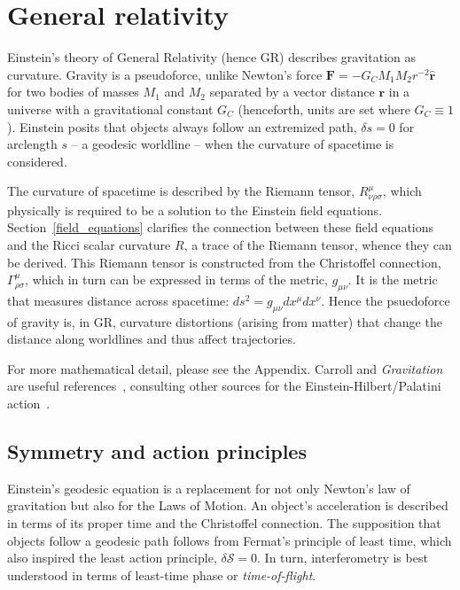     \section{General relativity}
    \label{general_relativity}

        Einstein's theory of General Relativity (hence GR) describes gravitation as curvature. 
Gravity is a pseudoforce, unlike Newton's force $\textbf{F} = -G_C M_1 M_2 r^{-2} \hat{\textbf{r}}$ for two bodies of masses $M_1$ and $M_2$ separated by a vector distance $\textbf{r}$ in a universe with a gravitational constant $G_C$ (henceforth, units are set where $G_C \equiv 1$).
 Einstein posits that objects always follow an extremized path, $\delta s = 0$ for arclength $s$  -- a geodesic worldline -- when the curvature of spacetime is considered. 

The curvature of spacetime is described by the Riemann tensor, $R^\mu_{\nu\rho\sigma}$, which physically is required to be a solution to the Einstein field equations. 
Section~\ref{field_equations} clarifies the connection between these field equations and the Ricci scalar curvature $R$, a trace of the Riemann tensor, whence they can be derived. 
This Riemann tensor is constructed from the Christoffel connection, $\Gamma^\mu_{\rho\sigma}$, which in turn can be expressed in terms of the metric, $g_{\mu \nu}$.
It is the metric that measures distance across spacetime: $ds^2 = g_{\mu\nu} dx^\mu dx^\nu$.
Hence the psuedoforce of gravity is, in GR, curvature distortions (arising from matter) that change the distance along worldlines and thus affect trajectories.

For more mathematical detail, please see the Appendix.
 Carroll and \textit{Gravitation} are useful references~\cite{Carroll1997,MisnerThorneWheeler}, consulting other sources for the Einstein-Hilbert/Palatini action~\cite{FarrThesis}.


        \subsection{Symmetry and action principles}
        \label{principles}

Einstein's geodesic equation is a replacement for not only Newton's law of gravitation but also for the Laws of Motion.
An object's acceleration is described in terms of its proper time and the Christoffel connection.
The supposition that objects follow a geodesic path follows from Fermat's principle of least time, which also inspired the least action principle, $\delta \mathcal{S} = 0$.
In turn, interferometry is best understood in terms of least-time phase or \textit{time-of-flight}.

